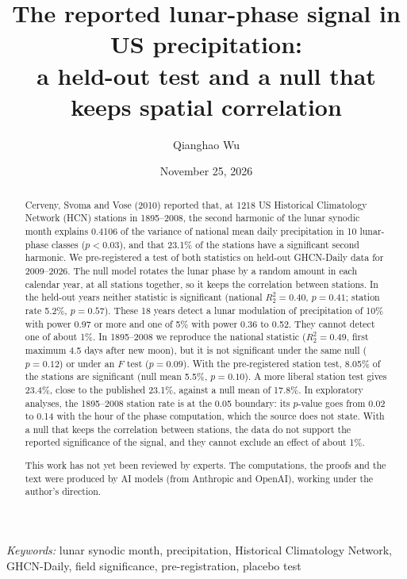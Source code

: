 \documentclass[11pt]{article}
\title{The reported lunar-phase signal in US precipitation:\\ a held-out test and a null that keeps spatial correlation}
\author{Qianghao Wu}
\date{November 25, 2026}
\newcommand{\Rtwo}{R^2_2}
\begin{document}
\maketitle
\begin{abstract}
Cerveny, Svoma and Vose (2010) reported that, at 1218 US Historical Climatology Network (HCN) stations in 1895--2008, the second harmonic of the lunar synodic month explains 0.4106 of the variance of national mean daily precipitation in 10 lunar-phase classes ($p<0.03$), and that 23.1\% of the stations have a significant second harmonic. We pre-registered a test of both statistics on held-out GHCN-Daily data for 2009--2026. The null model rotates the lunar phase by a random amount in each calendar year, at all stations together, so it keeps the correlation between stations. In the held-out years neither statistic is significant (national $\Rtwo=0.40$, $p=0.41$; station rate 5.2\%, $p=0.57$). These 18 years detect a lunar modulation of precipitation of 10\% with power 0.97 or more and one of 5\% with power 0.36 to 0.52. They cannot detect one of about 1\%. In 1895--2008 we reproduce the national statistic ($\Rtwo=0.49$, first maximum 4.5 days after new moon), but it is not significant under the same null ($p=0.12$) or under an $F$ test ($p=0.09$). With the pre-registered station test, 8.05\% of the stations are significant (null mean 5.5\%, $p=0.10$). A more liberal station test gives 23.4\%, close to the published 23.1\%, against a null mean of 17.8\%. In exploratory analyses, the 1895--2008 station rate is at the 0.05 boundary: its $p$-value goes from 0.02 to 0.14 with the hour of the phase computation, which the source does not state. With a null that keeps the correlation between stations, the data do not support the reported significance of the signal, and they cannot exclude an effect of about 1\%.

This work has not yet been reviewed by experts. The computations, the proofs and the text were produced by AI models (from Anthropic and OpenAI), working under the author's direction.
\end{abstract}
\medskip
\noindent\textit{Keywords:} lunar synodic month, precipitation, Historical Climatology Network, GHCN-Daily, field significance, pre-registration, placebo test
\end{document}
